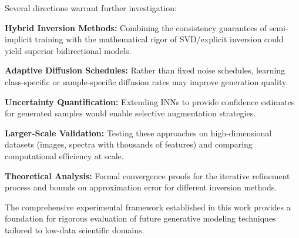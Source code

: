 \documentclass[sigconf]{acmart}
\begin{document}
Several directions warrant further investigation:

\textbf{Hybrid Inversion Methods:} Combining the consistency guarantees of semi-implicit training with the mathematical rigor of SVD/explicit inversion could yield superior bidirectional models.

\textbf{Adaptive Diffusion Schedules:} Rather than fixed noise schedules, learning class-specific or sample-specific diffusion rates may improve generation quality.

\textbf{Uncertainty Quantification:} Extending INNs to provide confidence estimates for generated samples would enable selective augmentation strategies.

\textbf{Larger-Scale Validation:} Testing these approaches on high-dimensional datasets (images, spectra with thousands of features) and comparing computational efficiency at scale.

\textbf{Theoretical Analysis:} Formal convergence proofs for the iterative refinement process and bounds on approximation error for different inversion methods.

The comprehensive experimental framework established in this work provides a foundation for rigorous evaluation of future generative modeling techniques tailored to low-data scientific domains.







\appendix

\end{document}
